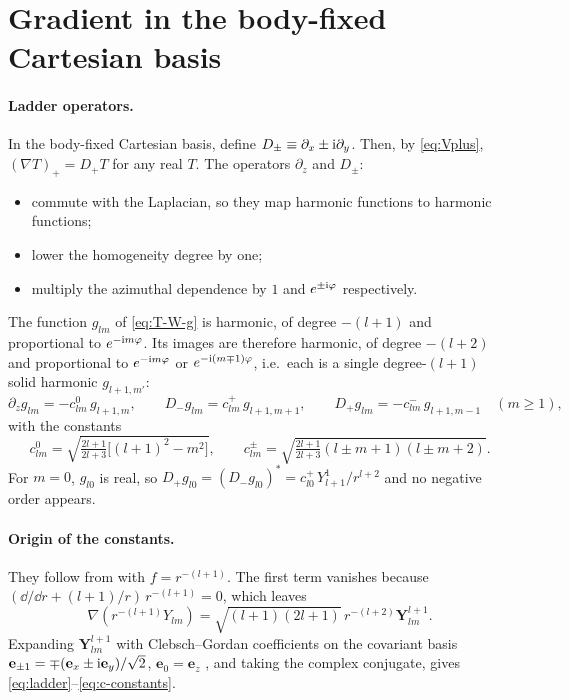 \section{Gradient in the body-fixed Cartesian basis}\label{sec:cart}
\paragraph{Ladder operators.} In the body-fixed Cartesian basis, define $D_\pm\equiv\partial_x\pm\mathrm{i}\partial_y$. Then, by \eqref{eq:Vplus}, $(\nabla T)_+=D_+T$ for any real $T$. The operators $\partial_z$ and $D_\pm$:
\begin{itemize}
  \item commute with the Laplacian, so they map harmonic functions to harmonic functions;
  \item lower the homogeneity degree by one;
  \item multiply the azimuthal dependence by $1$ and $e^{\pm\mathrm{i}\varphi}$ respectively.
\end{itemize}
The function $g_{lm}$ of \eqref{eq:T-W-g} is harmonic, of degree $-(l+1)$ and proportional to $e^{-\mathrm{i} m\varphi}$. Its images are therefore harmonic, of degree $-(l+2)$ and proportional to $e^{-\mathrm{i} m\varphi}$ or $e^{-\mathrm{i}(m\mp1)\varphi}$, i.e.\ each is a single degree-$(l+1)$ solid harmonic $g_{l+1,m'}$:
\begin{equation}
  \partial_zg_{lm}=-c^0_{lm}\,g_{l+1,m},\qquad D_-g_{lm}=c^+_{lm}\,g_{l+1,m+1},\qquad D_+g_{lm}=-c^-_{lm}\,g_{l+1,m-1}\quad(m\ge1), \label{eq:ladder}
\end{equation}
with the constants
\begin{equation}
  c^0_{lm}=\sqrt{\tfrac{2l+1}{2l+3}\big[(l+1)^2-m^2\big]},\qquad c^\pm_{lm}=\sqrt{\tfrac{2l+1}{2l+3}(l\pm m+1)(l\pm m+2)}. \label{eq:c-constants}
\end{equation}
For $m=0$, $g_{l0}$ is real, so $D_+g_{l0}=(D_-g_{l0})^*=c^+_{l0}\,Y_{l+1}^1/r^{l+2}$ and no negative order appears.

\paragraph{Origin of the constants.} They follow from \citet[eq.~7.3(51), first line]{Varshalovich1988} with $f=r^{-(l+1)}$. The first term vanishes because $(\dd/\dd r+(l+1)/r)\,r^{-(l+1)}=0$, which leaves
\[
  \nabla(r^{-(l+1)}Y_{lm})=\sqrt{(l+1)(2l+1)}\,r^{-(l+2)}\mathbf Y^{l+1}_{lm}.
\]
Expanding $\mathbf Y^{l+1}_{lm}$ with Clebsch--Gordan coefficients on the covariant basis $\mathbf e_{\pm1}=\mp(\mathbf e_x\pm\mathrm{i}\mathbf e_y)/\sqrt2$, $\mathbf e_0=\mathbf e_z$ \citep[eq.~1.1(20)]{Varshalovich1988}, and taking the complex conjugate, gives \eqref{eq:ladder}--\eqref{eq:c-constants}.

